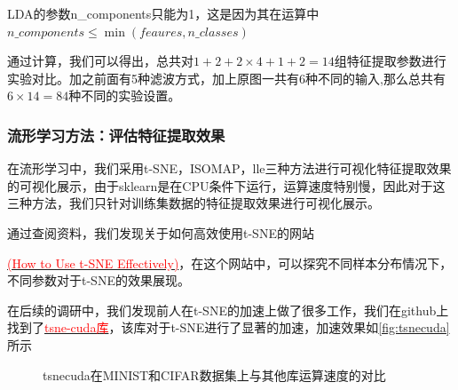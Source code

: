 \documentclass[12pt,hyperref,a4paper,UTF8]{ctexart}
\begin{document}
\par
LDA的参数n\_components只能为1，这是因为其在运算中$n\_components \le \min (feaures, n\_classes)$
\par
通过计算，我们可以得出，总共对$1+2+2\times 4 +1+2=14$组特征提取参数进行实验对比。加之前面有5种滤波方式，加上原图一共有6种不同的输入,那么总共有$6\times 14=84$种不同的实验设置。


\subsubsection{流形学习方法：评估特征提取效果}
在流形学习中，我们采用t-SNE，ISOMAP，lle三种方法进行可视化特征提取效果的可视化展示，由于sklearn是在CPU条件下运行，运算速度特别慢，因此对于这三种方法，我们只针对训练集数据的特征提取效果进行可视化展示。
\par
通过查阅资料，我们发现关于如何高效使用t-SNE的网站{\href{https://distill.pub/2016/misread-tsne}{\textcolor{red}{(How to Use t-SNE Effectively)}}，在这个网站中，可以探究不同样本分布情况下，不同参数对于t-SNE的效果展现。
\par
在后续的调研中，我们发现前人在t-SNE的加速上做了很多工作，我们在github上找到了\href{https://github.com/CannyLab/tsne-cuda}{\textcolor{red}{tsne-cuda库}}，该库对于t-SNE进行了显著的加速，加速效果如\autoref{fig:tsnecuda}所示
\begin{figure}[htbp]
	\centering
	\caption{tsnecuda在MINIST和CIFAR数据集上与其他库运算速度的对比}
	\label{fig:tsnecuda}
\end{figure}

}
\end{document}
